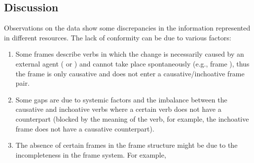 \documentclass[output=paper,colorlinks,citecolor=brown]{langscibook}
\begin{document}




\subsection{Discussion}\label{sec:discussion}

Observations on the data show some discrepancies in the information represented in different resources. The lack of conformity can be due to various factors: 

\begin{enumerate}[label=(\alph*)]
\item Some frames describe verbs in which the change is necessarily caused by an external agent ( or ) and cannot take place spontaneously (e.g., frame ), thus the frame is only causative and does not enter a causative\slash inchoative frame pair.

\item Some gaps are due to systemic factors and the imbalance between the causative and inchoative verbs where a certain verb does not have a counterpart (blocked by the meaning of the verb, for example, the inchoative frame  does not have a causative counterpart).

\item The absence of certain frames in the frame structure might be due to the incompleteness in the frame system.  For example, 
\end{enumerate}
\end{document}
